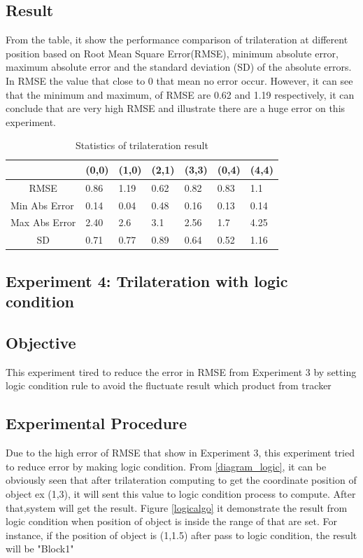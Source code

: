 \newpage
\subsection*{Result}
From the table, it show the performance comparison of trilateration at different position based on Root Mean Square Error(RMSE), minimum absolute error, maximum absolute error and the standard deviation (SD) of the absolute errors. In RMSE the value that close to 0 that mean no error occur. However, it can see that the minimum and maximum, of RMSE are 0.62 and 1.19 respectively, it can conclude that are very high RMSE and illustrate there are a huge error on this experiment.
\begin{table}[]
\begin{tabular}{|l|l|l|l|l|l|l|}
\hline
                           & \multicolumn{1}{c|}{(0,0)} & \multicolumn{1}{c|}{(1,0)} & (2,1) & (3,3) & (0,4) & (4,4) \\ \hline
\multicolumn{1}{|c|}{RMSE} & 0.86                       & 1.19                       & 0.62  & 0.82  & 0.83  & 1.1   \\ \hline
Min Abs Error              & 0.14                       & 0.04                       & 0.48  & 0.16  & 0.13  & 0.14  \\ \hline
Max Abs Error              & 2.40                       & 2.6                        & 3.1   & 2.56  & 1.7   & 4.25  \\ \hline
\multicolumn{1}{|c|}{SD}   & 0.71                       & 0.77                       & 0.89  & 0.64  & 0.52  & 1.16  \\ \hline
\end{tabular}
\caption{Statistics of trilateration result}
\label{result_rmse}
\end{table}

\newpage
\subsection{Experiment 4: Trilateration with logic condition}
\subsection*{Objective}
This experiment tired to reduce the error in RMSE from Experiment 3 by setting logic condition rule to avoid the fluctuate result which product from tracker
\subsection*{Experimental Procedure}
Due to the high error of RMSE that show in Experiment 3, this experiment tried to reduce error by making logic condition. From \ref{diagram_logic}, it can be obviously seen that after trilateration computing to get the coordinate position of object ex (1,3), it will sent this value to logic condition process to compute. After that,system will get the result. Figure \ref{logicalgo} it demonstrate the result from logic condition when position of object is inside the range of that are set. For instance, if the position of object is (1,1.5) after pass to logic condition, the result will be "Block1"

